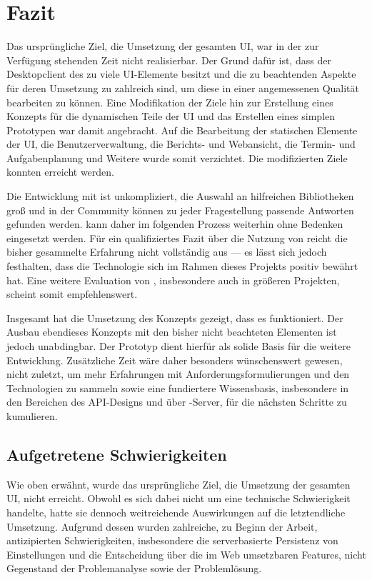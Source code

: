 \chapter{Fazit}\label{chap:conclusion}
Das ursprüngliche Ziel, die Umsetzung der gesamten UI, war in der zur Verfügung stehenden Zeit nicht realisierbar. Der Grund dafür ist, dass der Desktopclient des  zu viele UI-Elemente besitzt und die zu beachtenden Aspekte für deren Umsetzung zu zahlreich sind, um diese in einer angemessenen Qualität bearbeiten zu können. Eine Modifikation der Ziele hin zur Erstellung eines Konzepts für die dynamischen Teile der  UI und das Erstellen eines simplen Prototypen war damit angebracht. Auf die Bearbeitung der statischen Elemente der UI, die Benutzerverwaltung, die Berichts- und Webansicht, die Termin- und Aufgabenplanung und Weitere wurde somit verzichtet. Die modifizierten Ziele konnten erreicht werden.

Die Entwicklung mit  ist unkompliziert, die Auswahl an hilfreichen Bibliotheken groß und in der Community können zu jeder Fragestellung passende Antworten gefunden werden.  kann daher im folgenden Prozess weiterhin ohne Bedenken eingesetzt werden. Für ein qualifiziertes Fazit über die Nutzung von  reicht die bisher gesammelte Erfahrung nicht vollständig aus --- es lässt sich jedoch festhalten, dass die Technologie sich im Rahmen dieses Projekts positiv bewährt hat. Eine weitere Evaluation von , insbesondere auch in größeren Projekten, scheint somit empfehlenswert.

Insgesamt hat die Umsetzung des Konzepts gezeigt, dass es funktioniert. Der Ausbau ebendieses Konzepts mit den bisher nicht beachteten Elementen ist jedoch unabdingbar. Der Prototyp dient hierfür als solide Basis für die weitere Entwicklung. Zusätzliche Zeit wäre daher besonders wünschenswert gewesen, nicht zuletzt, um mehr Erfahrungen mit Anforderungsformulierungen und den Technologien zu sammeln sowie eine fundiertere Wissensbasis, insbesondere in den Bereichen des API-Designs und über -Server, für die nächsten Schritte zu kumulieren.

\section{Aufgetretene Schwierigkeiten}
Wie oben erwähnt, wurde das ursprüngliche Ziel, die Umsetzung der gesamten UI, nicht erreicht. Obwohl es sich dabei nicht um eine technische Schwierigkeit handelte, hatte sie dennoch weitreichende Auswirkungen auf die letztendliche Umsetzung. Aufgrund dessen wurden zahlreiche, zu Beginn der Arbeit, antizipierten Schwierigkeiten, insbesondere die serverbasierte Persistenz von Einstellungen und die Entscheidung über die im Web umsetzbaren Features, nicht Gegenstand der Problemanalyse sowie der Problemlösung.

